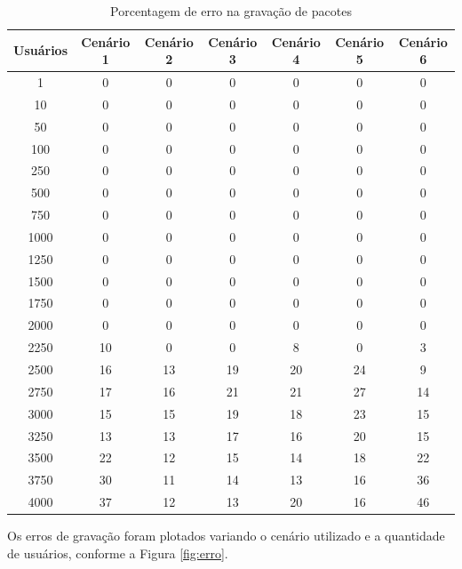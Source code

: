 \begin{table}[ht]
\centering
\caption{Porcentagem de erro na gravação de pacotes}
\label{tab:erro}
\begin{tabular}{|
>{\columncolor[HTML]{C0C0C0}}c |c|c|c|c|c|c|}
\hline
Usuários & \cellcolor[HTML]{C0C0C0}Cenário 1 & \cellcolor[HTML]{C0C0C0}Cenário 2 & \cellcolor[HTML]{C0C0C0}Cenário 3 & \cellcolor[HTML]{C0C0C0}Cenário 4 & \cellcolor[HTML]{C0C0C0}Cenário 5 & \cellcolor[HTML]{C0C0C0}Cenário 6 \\ \hline
1 & 0 & 0 & 0 & 0 & 0 & 0 \\ \hline
10 & 0 & 0 & 0 & 0 & 0 & 0 \\ \hline
50 & 0 & 0 & 0 & 0 & 0 & 0 \\ \hline
100 & 0 & 0 & 0 & 0 & 0 & 0 \\ \hline
250 & 0 & 0 & 0 & 0 & 0 & 0 \\ \hline
500 & 0 & 0 & 0 & 0 & 0 & 0 \\ \hline
750 & 0 & 0 & 0 & 0 & 0 & 0 \\ \hline
1000 & 0 & 0 & 0 & 0 & 0 & 0 \\ \hline
1250 & 0 & 0 & 0 & 0 & 0 & 0 \\ \hline
1500 & 0 & 0 & 0 & 0 & 0 & 0 \\ \hline
1750 & 0 & 0 & 0 & 0 & 0 & 0 \\ \hline
2000 & 0 & 0 & 0 & 0 & 0 & 0 \\ \hline
2250 & 10 & 0 & 0 & 8 & 0 & 3 \\ \hline
2500 & 16 & 13 & 19 & 20 & 24 & 9 \\ \hline
2750 & 17 & 16 & 21 & 21 & 27 & 14 \\ \hline
3000 & 15 & 15 & 19 & 18 & 23 & 15 \\ \hline
3250 & 13 & 13 & 17 & 16 & 20 & 15 \\ \hline
3500 & 22 & 12 & 15 & 14 & 18 & 22 \\ \hline
3750 & 30 & 11 & 14 & 13 & 16 & 36 \\ \hline
4000 & 37 & 12 & 13 & 20 & 16 & 46 \\ \hline
\end{tabular}
\end{table}


Os erros de gravação foram plotados variando o cenário utilizado e a quantidade de usuários, conforme a Figura \ref{fig:erro}. 


